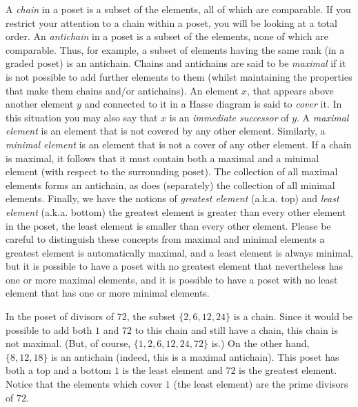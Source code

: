 \documentclass[10pt,]{book}
\theoremstyle{plain}
\theoremstyle{definition}
\theoremstyle{definition}
\numberwithin{equation}{section}
\begin{document}
    A \emph{chain} in a poset is a subset of the elements, all
    of which are comparable. If you restrict your attention to a chain within
    a poset, you will be looking at a total order.
    An \emph{antichain} in a poset is a subset
    of the elements, none of which are comparable. Thus, for example, a subset
    of elements having the same rank (in a graded poset) is an antichain.
    Chains and antichains are said to be \emph{maximal} if it
    is not possible to add further elements to them (whilst maintaining the
    properties that make them chains and/or antichains). An element \(x\), that
    appears above another element \(y\) \textemdash{} and connected to it \textemdash{} in a Hasse
    diagram is said to \emph{cover} it. In this situation
    you may also say that \(x\) is an \emph{immediate successor} of
    \(y\). A \emph{maximal element} is an element that is not covered by any other element. Similarly, a
    \emph{minimal element} is an element that is not a cover of any other element. If a chain is maximal, it follows that it
    must contain both a maximal and a minimal element (with respect to the
    surrounding poset). The collection of all maximal elements forms an antichain,
    as does (separately) the collection of all minimal elements. Finally,
    we have the notions of 
    \emph{greatest element} (a.k.a. top) and
    \emph{least element} (a.k.a.
    bottom) \textemdash{} the greatest element is greater than every
    other element in the poset, the least element is smaller than every other element. Please be careful to distinguish these
    concepts from maximal and minimal elements \textemdash{} a greatest element is
    automatically maximal, and a least element is always minimal, but it
    is possible to have a poset with no greatest element that nevertheless
    has one or more maximal elements, and it is possible to have a poset with no
    least element that has one or more minimal elements.
\par

    In the poset of divisors of \(72\), the subset \(\{2, 6, 12, 24\}\) is a chain.
    Since it would be possible to add both \(1\) and \(72\) to this chain and still
    have a chain, this chain is not maximal. (But, of course,
    \(\{1, 2, 6, 12, 24, 72\}\) is.) On the other hand,
    \(\{8, 12, 18\}\) is an antichain (indeed, this is a maximal antichain).
    This poset has both a top and a bottom \textemdash{} \(1\) is the least element
    and \(72\) is the greatest element. Notice that the elements which cover
    \(1\) (the least element) are the prime divisors of \(72\).
\typeout{************************************************}
\typeout{************************************************}
\end{document}
